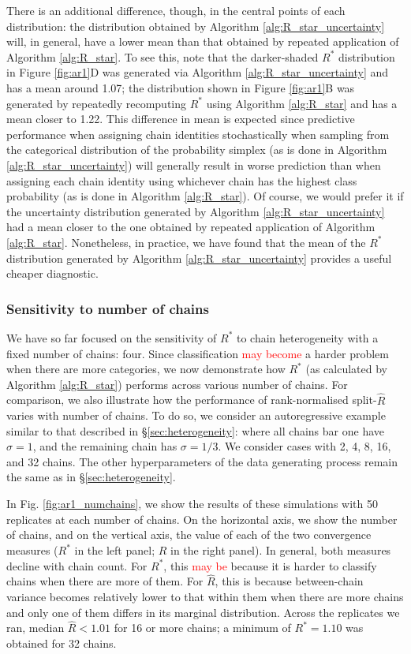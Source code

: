 \documentclass{article}
\begin{document}
There is an additional difference, though, in the central points of each distribution: the distribution obtained by Algorithm \ref{alg:R_star_uncertainty} will, in general, have a lower mean than that obtained by repeated application of Algorithm \ref{alg:R_star}. To see this, note that the darker-shaded $R^*$ distribution in Figure \ref{fig:ar1}D was generated via Algorithm \ref{alg:R_star_uncertainty} and has a mean around 1.07; the distribution shown in Figure \ref{fig:ar1}B was generated by repeatedly recomputing $R^*$ using Algorithm \ref{alg:R_star} and has a mean closer to 1.22. This difference in mean is expected since predictive performance when assigning chain identities stochastically when sampling from the categorical distribution of the probability simplex (as is done in Algorithm \ref{alg:R_star_uncertainty}) will generally result in worse prediction than when assigning each chain identity using whichever chain has the highest class probability (as is done in Algorithm \ref{alg:R_star}). Of course, we would prefer it if the uncertainty distribution generated by Algorithm \ref{alg:R_star_uncertainty} had a mean closer to the one obtained by repeated application of Algorithm \ref{alg:R_star}. Nonetheless, in practice, we have found that the mean of the $R^*$ distribution generated by Algorithm \ref{alg:R_star_uncertainty} provides a useful cheaper diagnostic.

\subsubsection{Sensitivity to number of chains}\label{sec:heterogeneity_numchains}
We have so far focused on the sensitivity of $R^*$ to chain heterogeneity with a fixed number of chains: four. Since classification \textcolor{red}{may become} a harder problem when there are more categories, we now demonstrate how $R^*$ (as calculated by Algorithm \ref{alg:R_star}) performs across various number of chains. For comparison, we also illustrate how the performance of rank-normalised split-$\widehat{R}$ varies with number of chains. To do so, we consider an autoregressive example similar to that described in \S\ref{sec:heterogeneity}: where all chains bar one have $\sigma=1$, and the remaining chain has $\sigma=1/3$. We consider cases with 2, 4, 8, 16, and 32 chains. The other hyperparameters of the data generating process remain the same as in \S\ref{sec:heterogeneity}.

In Fig. \ref{fig:ar1_numchains}, we show the results of these simulations with 50 replicates at each number of chains. On the horizontal axis, we show the number of chains, and on the vertical axis, the value of each of the two convergence measures ($R^*$ in the left panel; $\widehat{R}$ in the right panel). In general, both measures decline with chain count. For $R^*$, this \textcolor{red}{may be} because it is harder to classify chains when there are more of them. For $\widehat{R}$, this is because between-chain variance becomes relatively lower to that within them when there are more chains and only one of them differs in its marginal distribution. Across the replicates we ran, median $\widehat{R}<1.01$ for 16 or more chains; a minimum of $R^*=1.10$ was obtained for 32 chains.
\end{document}
